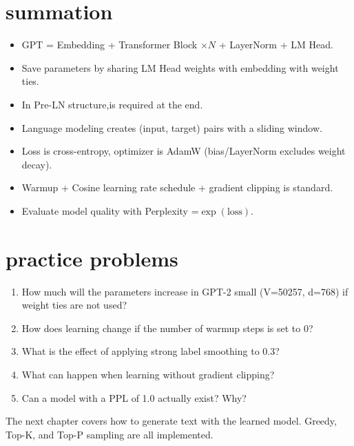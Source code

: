 \section{summation}

\begin{itemize}
  \item GPT = Embedding + Transformer Block $\times N$ + LayerNorm + LM Head.
\item Save parameters by sharing LM Head weights with embedding with weight ties.
\item In Pre-LN structure,is required at the end.
\item Language modeling creates (input, target) pairs with a sliding window.
\item Loss is cross-entropy, optimizer is AdamW (bias/LayerNorm excludes weight decay).
\item Warmup + Cosine learning rate schedule + gradient clipping is standard.
\item Evaluate model quality with Perplexity =$\exp(\text{loss})$.
\end{itemize}

\section{practice problems}

\begin{enumerate}
\item How much will the parameters increase in GPT-2 small (V=50257, d=768) if weight ties are not used?
\item How does learning change if the number of warmup steps is set to 0?
\item What is the effect of applying strong label smoothing to 0.3?
\item What can happen when learning without gradient clipping?
\item Can a model with a PPL of 1.0 actually exist? Why?
\end{enumerate}

The next chapter covers how to generate text with the learned model. Greedy, Top-K, and Top-P sampling are all implemented.

